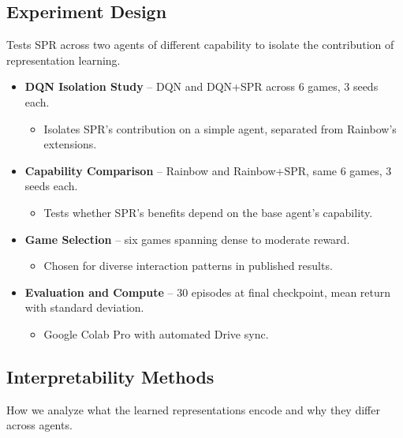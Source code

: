 \documentclass[11pt]{article}
\begin{document}
\subsection{Experiment Design}

\noindent Tests SPR across two agents of different capability to
isolate the contribution of representation learning.

\begin{itemize}
\item \textbf{DQN Isolation Study} -- DQN and DQN+SPR across 6 games,
  3 seeds each.
  \begin{itemize}[label=$\circ$, itemsep=0.2em, parsep=0pt, topsep=0pt, partopsep=0pt]
  \item Isolates SPR's contribution on a simple agent, separated
    from Rainbow's extensions.
  \end{itemize}
\item \textbf{Capability Comparison} -- Rainbow and Rainbow+SPR,
  same 6 games, 3 seeds each.
  \begin{itemize}[label=$\circ$, itemsep=0.2em, parsep=0pt, topsep=0pt, partopsep=0pt]
  \item Tests whether SPR's benefits depend on the base agent's
    capability.
  \end{itemize}
\item \textbf{Game Selection} -- six games spanning dense to
  moderate reward.
  \begin{itemize}[label=$\circ$, itemsep=0.2em, parsep=0pt, topsep=0pt, partopsep=0pt]
  \item Chosen for diverse interaction patterns in published
    results.
  \end{itemize}
\item \textbf{Evaluation and Compute} -- 30 episodes at final
  checkpoint, mean return with standard deviation.
  \begin{itemize}[label=$\circ$, itemsep=0.2em, parsep=0pt, topsep=0pt, partopsep=0pt]
  \item Google Colab Pro with automated Drive sync.
  \end{itemize}
\end{itemize}

\subsection{Interpretability Methods}

\noindent How we analyze what the learned representations encode and
why they differ across agents.
\end{document}
